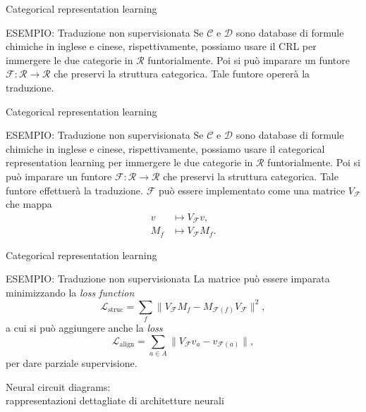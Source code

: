 \documentclass{beamer}
\begin{document}
\begin{frame}{Categorical representation learning}
    \begin{block}{ESEMPIO: Traduzione non supervisionata}
        Se $\mathcal{C}$ e $\mathcal{D}$ sono database di formule chimiche in inglese e cinese, rispettivamente, possiamo usare il CRL per immergere le due categorie in $\mathcal{R}$ funtorialmente. Poi si può imparare un funtore $\mathcal{F}: \mathcal{R} \to \mathcal{R}$ che preservi la struttura categorica. Tale funtore opererà la traduzione.
    \end{block}
\end{frame}

\begin{frame}{Categorical representation learning}
    \begin{block}{ESEMPIO: Traduzione non supervisionata}
        Se $\mathcal{C}$ e $\mathcal{D}$ sono database di formule chimiche in inglese e cinese, rispettivamente, possiamo usare il categorical representation learning per immergere le due categorie in $\mathcal{R}$ funtorialmente. Poi si può imparare un funtore $\mathcal{F}: \mathcal{R} \to \mathcal{R}$ che preservi la struttura categorica. Tale funtore effettuerà la traduzione. $\mathcal{F}$ può essere implementato come una matrice $V_{\mathcal{F}}$ che mappa
        \begin{align*}
            v &\mapsto V_{\mathcal{F}}v,\\
            M_f &\mapsto V_{\mathcal{F}}M_f.
        \end{align*}
    \end{block}
\end{frame}

\begin{frame}{Categorical representation learning}
    \begin{block}{ESEMPIO: Traduzione non supervisionata}
        La matrice può essere imparata minimizzando la \textit{loss function}
        \[\mathcal{L}_{\mathrm{struc}} = \sum_{f}\|V_{\mathcal{F}}M_f - M_{\mathcal{F}(f)}V_{\mathcal{F}}\|^2,\]
        a cui si può aggiungere anche la \textit{loss} 
        \[\mathcal{L}_{\mathrm{align}} = \sum_{a \in A}\|V_{\mathcal{F}}v_a - v_{\mathcal{F}(a)}\|,\]
        per dare parziale supervisione.
    \end{block}
\end{frame}

\begin{frame}[standout]
    \huge Neural circuit diagrams: \\\large rappresentazioni dettagliate di architetture neurali
\end{frame}
\end{document}
